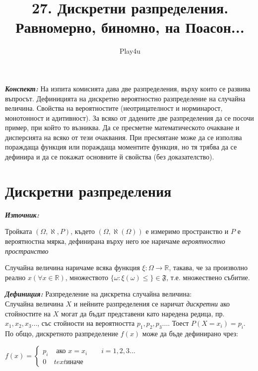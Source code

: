 \documentclass[11pt]{article} %
\title{27. Дискретни разпределения. Равномерно, биномно, на Поасон...}
\author{Play4u}
\newcommand{\italicBold}[1]{\textbf{\emph{#1}}}
\newcommand{\definition}{\italicBold{Дефиниция: }}
\newcommand{\source}{\italicBold{Източник: }}
\newcommand{\curlies}[1]{\{#1\}}
\begin{document}
\maketitle

\italicBold{Конспект: } На изпита комисията дава две разпределения, върху които се развива въпросът. Дефиницията на дискретно вероятностно разпределение на случайна величина. Свойства на вероятностите (неотрицателност и норминарост, монотонност и адитивност). За всяко от дадените две разпределения да се посочи пример, при който то възниква. Да се пресметне математическото очакване и дисперсията на всяко от тези очаквания. При пресмятане може да се използва пораждаща функция или пораждаща моментите функция, но тя трябва да се дефинира и да се покажат основните й свойства (без доказателство).


\section{Дискретни разпределения}
\source {}\\\par

Тройката $(\Omega, \aleph, P)$, където $(\Omega, \aleph(\Omega))$ е измеримо пространство и $P$ е вероятностна мярка, дефинирана върху него юе наричаме \textit{вероятностно пространство}\\\par

Случайна величина наричаме всяка функция $\xi : \Omega \to \mathbb{R}$, такава, че за произволно реално $x(\forall x \in \mathbb{R})$, множеството $\curlies{\omega:\xi(\omega)\leq }\in \mathfrak{F}$, т.е. множествено събитие.\\\par

\definition Разпределение на дискретна случайна величина:\\
Случайна величина $X$ и нейните разпределения се наричат \textit{дискретни} ако стойностите на $X$ могат да бъдат представени като наредена редица, пр. $x_{1}, x_{2}, x_{3}...$, със стойности на вероятността $p_{1}, p_{2}, p_{3}...$. Тоест $P(X=x_{i})=p_{i}$. По общо, дискретното разпределение $f(x)$ може да бъде дефинирано чрез:\\
\centerline{$f(x)=
\begin{cases} 
      p_{i} & \text{ ако } x=x_{i} \qquad i = 1,2,3... \\
      0 & text{иначе}
\end{cases}$}
\end{document}
